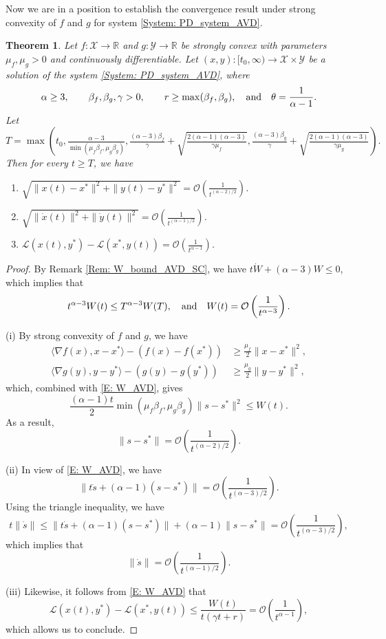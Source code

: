 \documentclass[pdflatex,sn-mathphys-num]{sn-jnl}
\theoremstyle{thmstyleone}
\newtheorem{theorem}{Theorem}
\theoremstyle{thmstyletwo}
\theoremstyle{thmstylethree}
\newcommand{\qbox}[1]{\quad\hbox{#1}\quad}
\newcommand{\R}{\mathbb{R}}
\newcommand{\X}{\mathcal{X}}
\newcommand{\Y}{\mathcal{Y}}
\begin{document}
Now we are in a position to establish the convergence result under strong convexity of $f$ and $g$ for system \eqref{System: PD_system_AVD}.


\begin{theorem}\label{Thm: AVD_SC}
Let $f:\X\to\R$ and $g:\Y\to\R$ be strongly convex with parameters $\mu_f,\mu_g>0$ and continuously differentiable. Let $(x,y):[t_0,\infty)\to\X\times\Y$ be a solution of the system \eqref{System: PD_system_AVD}, where
$$\alpha\ge3, \qbox{}\beta_f,\beta_g,\gamma>0, \qbox{} r\ge\max(\beta_f,\beta_g), \qbox{and} \theta = \frac{1}{\alpha-1}. $$
Let
$$T=\max\left( t_0, \tfrac{\alpha-3}{\min(\mu_f\beta_f,\mu_g\beta_g)}, \tfrac{(\alpha-3)\beta_f}{\gamma} + \sqrt{\tfrac{ 2(\alpha-1)(\alpha-3) }{\gamma\mu_f} }, \tfrac{(\alpha-3)\beta_g}{\gamma} + \sqrt{\tfrac{ 2(\alpha-1)(\alpha-3) }{\gamma\mu_g} } \right).$$
Then for every $t\ge T$, we have
\begin{enumerate}[label=(\roman*), itemsep=0.7em, leftmargin=12mm]
\item $\sqrt{\| x(t) - x^* \|^2 + \| y(t) - y^* \|^2} = \mathcal{O}\left( \frac{1}{t^{(\alpha-2)/2}} \right)$.

\item $\sqrt{ \| \dot{x}(t) \|^2 + \| \dot{y}(t) \|^2 } = \mathcal{O}\left( \frac{1}{t^{(\alpha-1)/2}} \right)$.

\item $\mathcal{L}(x(t),y^*) - \mathcal{L}(x^*,y(t)) = \mathcal{O}\left( \frac{1}{t^{\alpha-1}} \right)$.
\end{enumerate}
\end{theorem}


\begin{proof}
By Remark \ref{Rem: W_bound_AVD_SC}, we have $t\dot{W} + (\alpha-3)W \le 0$, which implies that
$$ t^{\alpha-3}W(t) \le T^{\alpha-3}W(T),\qbox{and} W(t) = \mathcal{O}\left( \frac{1}{t^{\alpha-3}} \right). $$

(i) By strong convexity of $f$ and $g$, we have
\begin{align*}
\langle \nabla f(x), x-x^* \rangle - ( f(x) - f(x^*) ) &\ge \frac{\mu_f}{2}\| x-x^* \|^2,\\
\langle \nabla g(y), y-y^* \rangle - ( g(y) - g(y^*) ) &\ge \frac{\mu_g}{2}\| y - y^* \|^2,
\end{align*}
which, combined with \eqref{E: W_AVD}, gives
$$ \frac{(\alpha-1)t}{2}\min(\mu_f\beta_f,\mu_g\beta_g) \| s-s^* \|^2 \le W(t). $$
As a result, 
$$ \| s-s^* \| = \mathcal{O}\left( \frac{1}{t^{(\alpha-2)/2}} \right). $$

(ii) In view of \eqref{E: W_AVD}, we have 
$$ \| t\dot{s} + (\alpha-1)(s-s^*) \| = \mathcal{O}\left( \frac{1}{t^{(\alpha-3)/2}} \right). $$
Using the triangle inequality, we have
$$ t\| \dot{s} \| \le \| t\dot{s} + (\alpha-1)(s-s^*) \| + (\alpha-1)\| s-s^* \| = \mathcal{O}\left( \frac{1}{t^{(\alpha-3)/2}} \right), $$
which implies that
$$ \| \dot{s} \| = \mathcal{O}\left( \frac{1}{t^{(\alpha-1)/2}} \right). $$ 

(iii) Likewise, it follows from \eqref{E: W_AVD} that
$$ \mathcal{L}(x(t),y^*) - \mathcal{L}(x^*,y(t)) \le \frac{W(t)}{t(\gamma t + r)} = \mathcal{O}\left( \frac{1}{t^{\alpha-1}} \right), $$
which allows us to conclude.
\end{proof}
\end{document}
